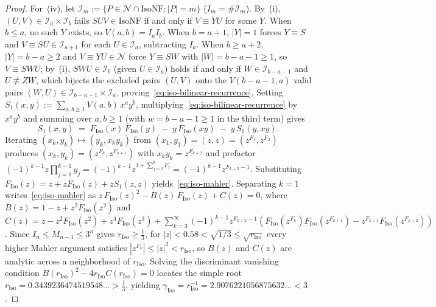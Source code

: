 \documentclass[11pt,reqno]{amsart}
\numberwithin{equation}{section}
\theoremstyle{plain}
\theoremstyle{definition}
\theoremstyle{remark}
\begin{document}
\begin{proof}
For~(iv), let $\mathcal{I}_m := \{ P \in \mathcal{N} \cap \mathrm{IsoNF} : |P| = m \}$ ($I_m = \#\mathcal{I}_m$). By~(i), $(U, V) \in \mathcal{I}_a \times \mathcal{I}_b$ fails $S U V \in \mathrm{IsoNF}$ if and only if $V \equiv Y U$ for some $Y$. When $b \le a$, no such $Y$ exists, so $V(a, b) = I_a I_b$. When $b = a + 1$, $|Y| = 1$ forces $Y \equiv S$ and $V \equiv S U \in \mathcal{I}_{a+1}$ for each $U \in \mathcal{I}_a$, subtracting $I_a$. When $b \ge a + 2$, $|Y| = b - a \ge 2$ and $V \equiv Y U \in \mathcal{N}$ force $Y \equiv S W$ with $|W| = b - a - 1 \ge 1$, so $V \equiv S W U$; by~(i), $S W U \in \mathcal{I}_b$ (given $U \in \mathcal{I}_a$) holds if and only if $W \in \mathcal{I}_{b-a-1}$ and $U \not\equiv Z W$, which bijects the excluded pairs $(U, V)$ onto the $V(b - a - 1, a)$ valid pairs $(W, U) \in \mathcal{I}_{b-a-1} \times \mathcal{I}_a$, proving~\eqref{eq:iso-bilinear-recurrence}. Setting $S_1(x, y) := \sum_{a, b \ge 1} V(a, b)\,x^a y^b$, multiplying~\eqref{eq:iso-bilinear-recurrence} by $x^a y^b$ and summing over $a, b \ge 1$ (with $w = b - a - 1 \ge 1$ in the third term) gives
\[
S_1(x, y) \;=\; F_{\mathrm{Iso}}(x)\,F_{\mathrm{Iso}}(y) \;-\; y\,F_{\mathrm{Iso}}(x y) \;-\; y\,S_1(y, x y).
\]
Iterating $(x_k, y_k) \mapsto (y_k, x_k y_k)$ from $(x_1, y_1) = (z, z) = (z^{F_1}, z^{F_2})$ produces $(x_k, y_k) = (z^{F_k}, z^{F_{k+1}})$ with $x_k y_k = z^{F_{k+2}}$ and prefactor $(-1)^{k-1} z \prod_{j=1}^{k-1} y_j = (-1)^{k-1} z^{1 + \sum_{j=2}^k F_j} = (-1)^{k-1} z^{F_{k+2}-1}$. Substituting $F_{\mathrm{Iso}}(z) = z + z F_{\mathrm{Iso}}(z) + z S_1(z, z)$ yields~\eqref{eq:iso-mahler}. Separating $k = 1$ writes~\eqref{eq:iso-mahler} as $z\,F_{\mathrm{Iso}}(z)^2 - B(z)\,F_{\mathrm{Iso}}(z) + C(z) = 0$, where $B(z) = 1 - z + z^2 F_{\mathrm{Iso}}(z^2)$ and $C(z) = z - z^2 F_{\mathrm{Iso}}(z^2) + z^4 F_{\mathrm{Iso}}(z^3) + \sum_{k=3}^{\infty} (-1)^{k-1} z^{F_{k+2}-1}(F_{\mathrm{Iso}}(z^{F_k}) F_{\mathrm{Iso}}(z^{F_{k+1}}) - z^{F_{k+1}} F_{\mathrm{Iso}}(z^{F_{k+2}}))$. Since $I_n \le M_{n-1} \le 3^n$ gives $r_{\mathrm{Iso}} \ge \frac{1}{3}$, for $|z| < 0.58 < \sqrt{1/3} \le \sqrt{r_{\mathrm{Iso}}}$ every higher Mahler argument satisfies $|z^{F_k}| \le |z|^2 < r_{\mathrm{Iso}}$, so $B(z)$ and $C(z)$ are analytic across a neighborhood of $r_{\mathrm{Iso}}$. Solving the discriminant vanishing condition $B(r_{\mathrm{Iso}})^2 - 4 r_{\mathrm{Iso}} C(r_{\mathrm{Iso}}) = 0$ locates the simple root $r_{\mathrm{Iso}} = 0.3439236474519548\dots > \frac{1}{3}$, yielding $\gamma_{\mathrm{Iso}} = r_{\mathrm{Iso}}^{-1} = 2.9076221056875632\dots < 3$.
\end{proof}
\end{document}
